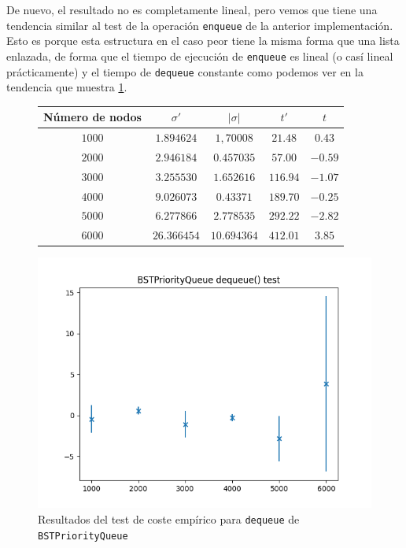 \documentclass[a4paper, 12pt]{article}
\begin{document}
                De nuevo, el resultado no es completamente lineal, pero vemos
                que tiene una tendencia similar al test de la operación 
                \texttt{enqueue} de la anterior implementación. Esto es porque 
                esta estructura en el caso peor tiene la misma forma que una 
                lista enlazada, de forma que el tiempo de ejecución de 
                \texttt{enqueue} es lineal (o casí lineal prácticamente) y el 
                tiempo de \texttt{dequeue} constante como podemos ver en la 
                tendencia que muestra \ref{f:deq_bst_test}.
                

                \begin{figure}[ht!]
                    \centering
                    \begin{tabular}{|c|c|c|c|c|}
                        \hline
                        \textbf{Número de nodos} & \textbf{$\sigma'$} & \textbf{$|\sigma|$} & \textbf{$t'$}    & \textbf{$t$}      \\\hline
                        $1000$                   & $1.894624$         & $1,70008$          & $21.48$         & $0.43$        \\\hline
                        $2000$                   & $2.946184$         & $0.457035$         & $57.00$         & $-0.59$        \\\hline
                        $3000$                   & $3.255530$         & $1.652616$          & $116.94$        & $-1.07$       \\\hline
                        $4000$                   & $9.026073$         & $0.43371$          & $189.70$        & $-0.25$       \\\hline
                        $5000$                   & $6.277866$         & $2.778535$         & $292.22$        & $-2.82$        \\\hline
                        $6000$                   & $26.366454$        & $10.694364$          & $412.01$        & $3.85$       \\\hline                  
                    \end{tabular}
                    \includegraphics[]{img/costemp_bst_deq.png}
                    \caption{Resultados del test de coste empírico para 
                    \texttt{dequeue} de \texttt{BSTPriorityQueue}}
                    \label{f:deq_bst_test}
                \end{figure}
              
\end{document}
